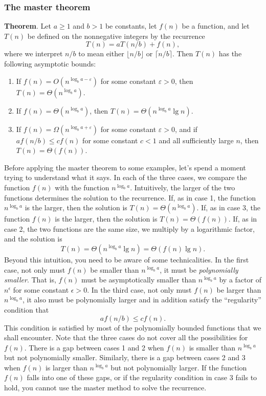 \documentclass{report}
\begin{document}
        \subsubsection{The master theorem}
        \bigbreak \noindent 
        \textbf{Theorem}. Let \( a \geq 1 \) and \( b > 1 \) be constants, let \( f(n) \) be a function, and let \( T(n) \) be defined on the nonnegative integers by the recurrence
        \[
            T(n) = aT(n/b) + f(n),
        \]
        where we interpret \( n/b \) to mean either \( \lfloor n/b \rfloor \) or \( \lceil n/b \rceil \). Then \( T(n) \) has the following asymptotic bounds:
        \begin{enumerate}
            \item If \( f(n) = O(n^{\log_b a - \varepsilon}) \) for some constant \( \varepsilon > 0 \), then \( T(n) = \Theta(n^{\log_b a}) \).
            \item If \( f(n) = \Theta(n^{\log_b a}) \), then \( T(n) = \Theta(n^{\log_b a} \lg n) \).
            \item If \( f(n) = \Omega(n^{\log_b a + \varepsilon}) \) for some constant \( \varepsilon > 0 \), and if \( af(n/b) \leq cf(n) \) for some constant \( c < 1 \) and all sufficiently large \( n \), then \( T(n) = \Theta(f(n)) \).
        \end{enumerate}
        \bigbreak \noindent 
        Before applying the master theorem to some examples, let’s spend a moment trying to understand what it says. In each of the three cases, we compare the function \( f(n) \) with the function \( n^{\log_b a} \). Intuitively, the larger of the two functions determines the solution to the recurrence. If, as in case 1, the function \( n^{\log_b a} \) is the larger, then the solution is \( T(n) = \Theta(n^{\log_b a}) \). If, as in case 3, the function \( f(n) \) is the larger, then the solution is \( T(n) = \Theta(f(n)) \). If, as in case 2, the two functions are the same size, we multiply by a logarithmic factor, and the solution is 
        \[
            T(n) = \Theta(n^{\log_b a} \lg n) = \Theta(f(n) \lg n).
        \]
        Beyond this intuition, you need to be aware of some technicalities. In the first case, not only must \( f(n) \) be smaller than \( n^{\log_b a} \), it must be \emph{polynomially smaller}.
        That is, \( f(n) \) must be asymptotically smaller than \( n^{\log_b a} \) by a factor of \( n^\epsilon \) for some constant \( \epsilon > 0 \). In the third case, not only must \( f(n) \) be larger than \( n^{\log_b a} \), it also must be polynomially larger and in addition satisfy the “regularity” condition that 
        \[
            a f(n/b) \leq c f(n).
        \]
        This condition is satisfied by most of the polynomially bounded functions that we shall encounter.
        \bigbreak \noindent 
        Note that the three cases do not cover all the possibilities for \( f(n) \). There is a gap between cases 1 and 2 when \( f(n) \) is smaller than \( n^{\log_b a} \) but not polynomially smaller. Similarly, there is a gap between cases 2 and 3 when \( f(n) \) is larger than \( n^{\log_b a} \) but not polynomially larger. If the function \( f(n) \) falls into one of these gaps, or if the regularity condition in case 3 fails to hold, you cannot use the master method to solve the recurrence.
        \bigbreak \noindent 
\end{document}
